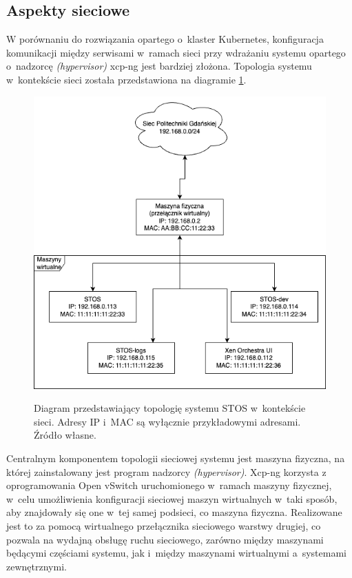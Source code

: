 \subsection{Aspekty sieciowe}
W porównaniu do rozwiązania opartego o~klaster Kubernetes, konfiguracja komunikacji między serwisami w~ramach sieci przy wdrażaniu systemu opartego o~nadzorcę \textit{(hypervisor)} xcp-ng jest bardziej złożona. Topologia systemu w~kontekście sieci została przedstawiona na diagramie \ref{diagramSiecStos}.
\begin{figure}[!h]
	\begin{center}
		\resizebox{0.7\textwidth}{!} {
			\includegraphics{img/4/wdrozeniesiec.png}
		}
		\caption[Topologia sieciowa wdrożonego systemu STOS]{Diagram przedstawiający topologię systemu STOS w~kontekście sieci. Adresy IP i~MAC są wyłącznie przykładowymi adresami. Źródło własne.}
		\label{diagramSiecStos}
	\end{center}
\end{figure}
\noindent Centralnym komponentem topologii sieciowej systemu jest maszyna fizyczna, na której zainstalowany jest program nadzorcy \textit{(hypervisor)}. Xcp-ng korzysta z oprogramowania Open vSwitch uruchomionego w~ramach maszyny fizycznej, w~celu umożliwienia konfiguracji sieciowej maszyn wirtualnych w~taki sposób, aby znajdowały się one w~tej samej podsieci, co maszyna fizyczna\cite{xcpNetwork}. Realizowane jest to za pomocą wirtualnego przełącznika sieciowego warstwy drugiej, co pozwala na wydajną obsługę ruchu sieciowego, zarówno między maszynami będącymi częściami systemu, jak i~między maszynami wirtualnymi a~systemami zewnętrznymi\cite{vswitch}.
